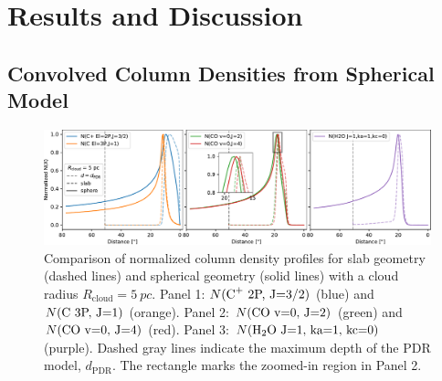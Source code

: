 \documentclass[12pt,a4paper]{article}
\newcommand{\mr}{\mathrm}
\newcommand{\qt}[1]{}
\begin{document}



\section{Results and Discussion} \label{sec:results}
\subsection{Convolved Column Densities from Spherical Model} \label{sec:convcolden}

\begin{figure}
    \centering
    \includegraphics[width=\textwidth,keepaspectratio]{column_densities.pdf} 
    \caption{Comparison of normalized column density profiles for slab geometry (dashed lines) and spherical geometry (solid lines) with a cloud radius \( R_\mr{cloud} = \qty{5}{pc} \). Panel 1: \( N(\ce{C^+}\ \text{2P, J=3/2}) \) (blue) and \( N(\ce{C}\ \text{3P, J=1}) \) (orange). Panel 2: \( N(\ce{CO}\ \text{v=0, J=2}) \) (green) and \( N(\ce{CO}\ \text{v=0, J=4}) \) (red). Panel 3: \( N(\ce{H2O}\ \text{J=1, ka=1, kc=0}) \) (purple). Dashed gray lines indicate the maximum depth of the PDR model,  $d_\mr{PDR}$. The rectangle marks the zoomed-in region in Panel 2.} \label{fig:colden}  
\end{figure}
\end{document}

